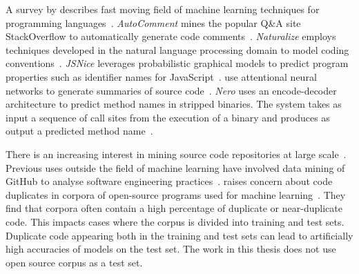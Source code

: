 A \citeyear{Allamanis2017a} survey by \citeauthor{Allamanis2017a} describes fast moving field of machine learning techniques for programming languages~\cite{Allamanis2017a}.
\emph{AutoComment} mines the popular Q\&A site StackOverflow to automatically generate code comments~\cite{Wong2013}.
\emph{Naturalize} employs techniques developed in the natural language processing domain to model coding conventions~\cite{Allamanis2014a}.
\emph{JSNice} leverages probabilistic graphical models to predict program properties such as identifier names for JavaScript~\cite{Raychev2015}.
\citeauthor{Allamanis2016} use attentional neural networks to generate summaries of source code~\cite{Allamanis2016}.
\emph{Nero} uses an encode-decoder architecture to predict method names in stripped binaries. The system takes as input a sequence of call sites from the execution of a binary and produces as output a predicted method name~\cite{David2019}.

There is an increasing interest in mining source code repositories at large scale~\cite{Allamanis2013a,White2015a,Bird2009}. Previous uses outside the field of machine learning have involved data mining of GitHub to analyse software engineering practices~\cite{Wu2014,Guzman2014,Baishakhi2014a,Vasilescu2015}.
\citeauthor{Allamanis} raises concern about code duplicates in corpora of open-source programs used for machine learning~\cite{Allamanis}. They find that corpora often contain a high percentage of duplicate or near-duplicate code. This impacts cases where the corpus is divided into training and test sets. Duplicate code appearing both in the training and test sets can lead to artificially high accuracies of models on the test set. The work in this thesis does not use open source corpus as a test set.

